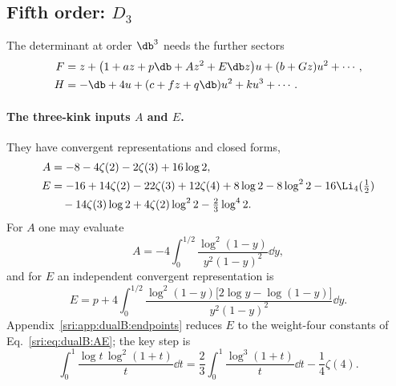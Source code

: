 \subsection{Fifth order: \texorpdfstring{$D_3$}{D3}}\label{sri:app:dualB:D3}
The determinant at order $\db^3$ needs the further sectors
\begin{equation}
\begin{aligned}
 F&=z+\bigl(1+az+p\db+Az^2+E\db z\bigr)u+(b+Gz)u^2+\cdots,\\
 H&=-\db+4u+(c+fz+q\db)u^2+ku^3+\cdots.
\end{aligned}
\label{sri:eq:dualB:beta3}
\end{equation}

\paragraph{The three-kink inputs $A$ and $E$.} They have convergent representations and closed forms,
\begin{equation}
\begin{aligned}
 A&=-8-4\zeta(2)-2\zeta(3)+16\log2,\\
 E&=-16+14\zeta(2)-22\zeta(3)+12\zeta(4)+8\log2-8\log^22-16\Li_4(\tfrac12)\\
 &\quad-14\zeta(3)\log2+4\zeta(2)\log^22-\tfrac23\log^42.
\end{aligned}
\label{sri:eq:dualB:AE}
\end{equation}
For $A$ one may evaluate
\begin{equation}
 A=-4\int_0^{1/2}\frac{\log^2(1-y)}{y^2(1-y)^2}\dd y,
\end{equation}
and for $E$ an independent convergent representation is
\begin{equation}
 E=p+4\int_0^{1/2}\frac{\log^2(1-y)\bigl[2\log y-\log(1-y)\bigr]}{y^2(1-y)^2}\dd y.
 \label{sri:eq:dualB:Erep}
\end{equation}
Appendix~\ref{sri:app:dualB:endpoints} reduces $E$ to the weight-four constants of Eq.~\eqref{sri:eq:dualB:AE}; the key step is
\begin{equation}
 \int_0^1\frac{\log t\,\log^2(1+t)}{t}\dd t=\frac23\int_0^1\frac{\log^3(1+t)}{t}\dd t-\frac14\zeta(4).
\end{equation}

